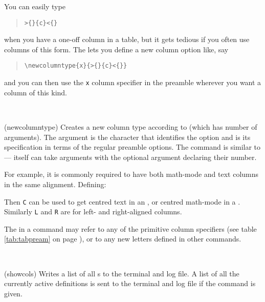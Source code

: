      You can easily type
 \begin{quote}
   \verb?>{?\verb?}{c}<{?\verb?}?
 \end{quote}
when you have a one-off column in a table, but it gets tedious
 if you often use columns of this form. 
The \cmd{\newcolumntype} lets you define a new column option like, say
 \begin{quote}
   \verb?\newcolumntype{x}{>{?\verb?}{c}<{?\verb?}}?\hspace*{-3cm} 
 \end{quote}
and you can then use the \texttt{x} column specifier in the preamble wherever
you want a column of this kind.

\begin{syntax}
\cmd{\newcolumntype} \\
\end{syntax}
\glossary(newcolumntype)
  {}%
  {Creates a new column type  according to  (which has
    number of arguments).}
The  argument is the character that identifies the option 
and 
is its specification in terms of the regular preamble options.
The \cmd{\newcolumntype} command is similar to \cmd{\newcommand} --- 
 itself can take arguments with the optional 
argument declaring their number. 

    For example, it is commonly required to have both math-mode and text 
columns in the same alignment. Defining:
\begin{lcode}
\end{lcode}
 Then \texttt{C} can be used to get centred text in an
, or centred math-mode in a . Similarly
\texttt{L} and \texttt{R} are for left- and right-aligned columns.

 The  in a \cmd{\newcolumntype} command may refer to any of
 the primitive column specifiers (see table \ref{tab:tabpream} on page
 \pageref{tab:tabpream}), or to any new letters defined in other
\cmd{\newcolumntype} commands.

\begin{syntax}
\cmd{\showcols} \\
\end{syntax}
\glossary(showcols)%
  {}%
  {Writes a list of all s to the terminal and log file.}
   A list of all the currently active
\cmd{\newcolumntype} definitions is sent to the terminal and log file if
 the \cmd{\showcols} command is given.

